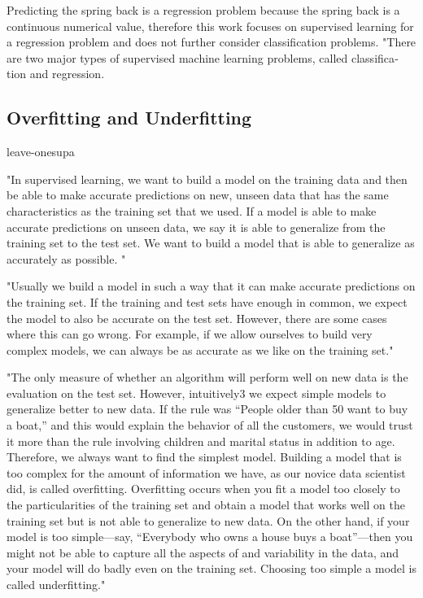 Predicting the spring back is a regression problem because the spring back is a continuous numerical value, therefore this work focuses on supervised learning for a regression problem and does not further consider classification problems.
"There are two major types of supervised machine learning problems, called classifica‐
tion and regression.


\subsection{Overfitting and Underfitting}leave-onesupa

"In supervised learning, we want to build a model on the training data
and then be able to make accurate predictions on new, unseen data that
has the same characteristics as the training set that we used. If a
model is able to make accurate predictions on unseen data, we say it is
able to generalize from the training set to the test set. We want to
build a model that is able to generalize as accurately as possible. " \cite[p. 35]{muller_introductionmachinelearning_2016}

"Usually we build a model in such a way that it can make accurate
predictions on the training set. If the training and test sets have
enough in common, we expect the model to also be accurate on the test
set. However, there are some cases where this can go wrong. For example,
if we allow ourselves to build very complex models, we can always be as
accurate as we like on the training set." 
\cite[p. 35]{muller_introductionmachinelearning_2016}

"The only measure of whether an algorithm will perform well on new data
is the evaluation on the test set. However, intuitively3 we expect simple models to generalize
better to new data. If the rule was “People older than 50 want to buy a
boat,” and this would explain the behavior of all the
customers, we would trust it more than the rule involving children and
marital status in addition to age. Therefore, we always want to find
the simplest model. Building a model that is too complex for the amount
of information we have, as our novice data scientist did, is called
overfitting. Overfitting occurs when you fit a model too closely to
the particularities of the training set and obtain a model that works
well on the training set but is not able to generalize to new data. On
the other hand, if your model is too simple—say, “Everybody who owns a
house buys a boat”—then you might not be able to capture all the
aspects of and variability in the data, and your model will do badly even
on the training set. Choosing too simple a model is called
underfitting."  \cite[p. 35]{muller_introductionmachinelearning_2016}

